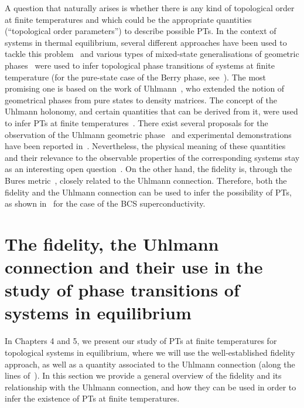 A question that naturally arises is whether there is any kind of topological order at finite temperatures  and which could be the appropriate quantities (``topological order parameters'') to describe possible PTs. In the context of systems in thermal equilibrium, several different approaches have been used to tackle this problem~\cite{viy:riv:del:12,riv:viy:del:13,bar:bar:krau:rico:ima:zol:die:13,nie:hub:14,bar:waw:alt:flei:die:17,grus:17} and various types of mixed-state generalisations of geometric phases~\cite{uhl:89,sjo:15} were used to infer topological phase transitions of systems at finite temperature (for the pure-state case of the Berry phase, see~\cite{car:pac:05,reu:har:ple:07}). The most promising one is based on the work of Uhlmann~\cite{uhl:89}, who extended the notion of geometrical phases from pure states to density matrices. The concept of the Uhlmann holonomy, and certain quantities that can be derived from it, were used to infer PTs at finite temperatures~\cite{hub:93,viy:riv:del:14, viy:riv:del:2d:14,zho:aro:14,pau:vie:08,viy:riv:mar:15}. There exist several proposals for the observation of the Uhlmann geometric phase~\cite{tid:sjo:03, abe:kul:sjo:oi:07} and experimental demonstrations have been reported in~\cite{uhl:pha:exp:11,viy:riv:gas:wal:fil:del:18}. Nevertheless, the physical meaning of these quantities and their relevance to the observable properties of the corresponding systems stay as an interesting open question~\cite{sjo:15, kem:que:smi:16, bud:die:15}. On the other hand, the fidelity is, through the Bures metric~\cite{zan:ven:gio:07}, closely related to the Uhlmann connection. Therefore, both the fidelity and the Uhlmann connection can be used to infer the possibility of PTs, as shown in~\cite{pau:vie:08} for the case of the BCS superconductivity.


\section{The fidelity, the Uhlmann connection and their use in the study of phase transitions of systems in equilibrium}
In Chapters 4 and 5, we present our study of PTs at finite temperatures for topological systems in equilibrium, where we will use the well-established fidelity approach, as well as a quantity associated to the Uhlmann connection (along the lines of~\cite{pau:vie:08}). In this section we provide a general overview of the fidelity and its relationship with the Uhlmann connection, and how they can be used in order to infer the existence of PTs at finite temperatures.

